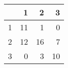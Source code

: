 \begin{tabular}{rrrr}
  \hline
 & 1 & 2 & 3 \\ 
  \hline
1 &  11 &   1 &   0 \\ 
  2 &  12 &  16 &   7 \\ 
  3 &   0 &   3 &  10 \\ 
   \hline
\end{tabular}
